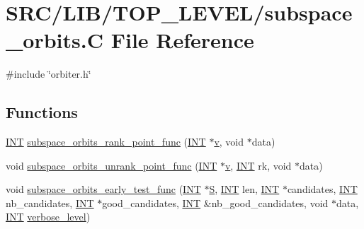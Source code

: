 \hypertarget{subspace__orbits_8_c}{}\section{S\+R\+C/\+L\+I\+B/\+T\+O\+P\+\_\+\+L\+E\+V\+E\+L/subspace\+\_\+orbits.C File Reference}
\label{subspace__orbits_8_c}
{\ttfamily \#include \char`\"{}orbiter.\+h\char`\"{}}\newline
\subsection*{Functions}
\begin{DoxyCompactItemize}
\item 
\mbox{\hyperlink{galois_8h_a09fddde158a3a20bd2dcadb609de11dc}{I\+NT}} \mbox{\hyperlink{subspace__orbits_8_c_afdf4004854a2e254a5a4ea79313b702c}{subspace\+\_\+orbits\+\_\+rank\+\_\+point\+\_\+func}} (\mbox{\hyperlink{galois_8h_a09fddde158a3a20bd2dcadb609de11dc}{I\+NT}} $\ast$\mbox{\hyperlink{simeon_8_c_aeb3f3030944801b163bc3b829a7f6710}{v}}, void $\ast$data)
\item 
void \mbox{\hyperlink{subspace__orbits_8_c_a6aa145d65ac1080fffaecc93d6de8e4f}{subspace\+\_\+orbits\+\_\+unrank\+\_\+point\+\_\+func}} (\mbox{\hyperlink{galois_8h_a09fddde158a3a20bd2dcadb609de11dc}{I\+NT}} $\ast$\mbox{\hyperlink{simeon_8_c_aeb3f3030944801b163bc3b829a7f6710}{v}}, \mbox{\hyperlink{galois_8h_a09fddde158a3a20bd2dcadb609de11dc}{I\+NT}} rk, void $\ast$data)
\item 
void \mbox{\hyperlink{subspace__orbits_8_c_abd507fb4877a2bb112f530ba9585c900}{subspace\+\_\+orbits\+\_\+early\+\_\+test\+\_\+func}} (\mbox{\hyperlink{galois_8h_a09fddde158a3a20bd2dcadb609de11dc}{I\+NT}} $\ast$\mbox{\hyperlink{simeon_8_c_adab47f8243f1b5a2c31df2535d6b37d0}{S}}, \mbox{\hyperlink{galois_8h_a09fddde158a3a20bd2dcadb609de11dc}{I\+NT}} len, \mbox{\hyperlink{galois_8h_a09fddde158a3a20bd2dcadb609de11dc}{I\+NT}} $\ast$candidates, \mbox{\hyperlink{galois_8h_a09fddde158a3a20bd2dcadb609de11dc}{I\+NT}} nb\+\_\+candidates, \mbox{\hyperlink{galois_8h_a09fddde158a3a20bd2dcadb609de11dc}{I\+NT}} $\ast$good\+\_\+candidates, \mbox{\hyperlink{galois_8h_a09fddde158a3a20bd2dcadb609de11dc}{I\+NT}} \&nb\+\_\+good\+\_\+candidates, void $\ast$data, \mbox{\hyperlink{galois_8h_a09fddde158a3a20bd2dcadb609de11dc}{I\+NT}} \mbox{\hyperlink{simeon_8_c_a818073fbcc2f439e7c56952f67386122}{verbose\+\_\+level}})
\end{DoxyCompactItemize}


